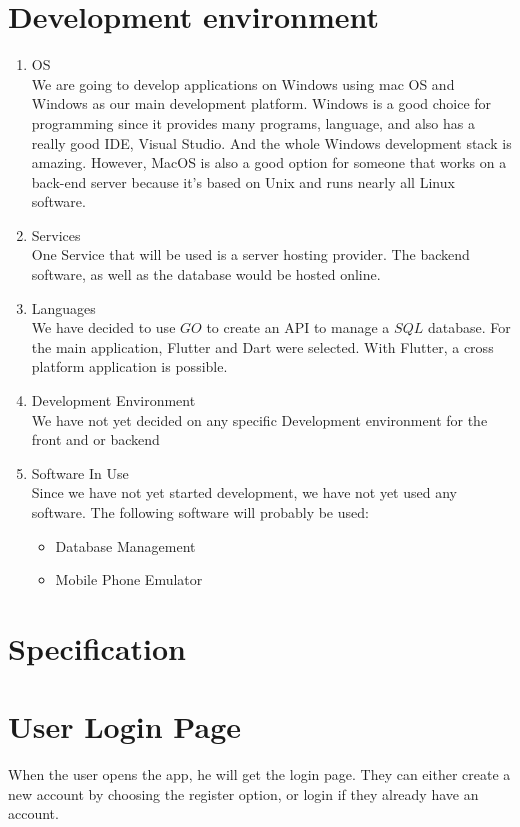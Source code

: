 \documentclass[10pt]{article}
\begin{document}
\section{Development environment}
\begin{enumerate}
  \item {OS} \\
  We are going to develop applications on Windows using mac OS and Windows as our main development platform. Windows is a good choice for programming since it provides many programs, language, and also has a really good IDE, Visual Studio. And the whole Windows development stack is amazing. However, MacOS is also a good option for someone that works on a back-end server because it's based on Unix and runs nearly all Linux software.
  
  \item {Services} \\
  One Service that will be used is a server hosting provider. The backend software, as well as the database would be hosted online.
  
  \item {Languages} \\
  We have decided to use $G O$ to create an API to manage a $S Q L$ database. For the main application, Flutter and Dart were selected. With Flutter, a cross platform application is possible.
  
  \item {Development Environment} \\
  We have not yet decided on any specific Development environment for the front and or backend
  
  \item {Software In Use} \\
  Since we have not yet started development, we have not yet used any software. The following software will probably be used:

  \begin{itemize}
    \item Database Management

    \item Mobile Phone Emulator

  \end{itemize}
\end{enumerate}

\section{Specification}
\section{User Login Page}
When the user opens the app, he will get the login page. They can either create a new account by choosing the register option, or login if they already have an account.
\end{document}
